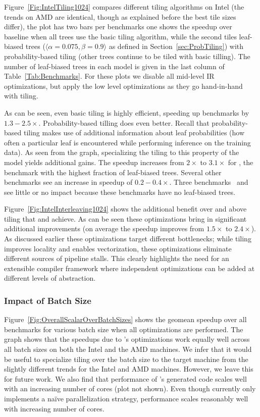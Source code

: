 Figure~\ref{Fig:IntelTiling1024} compares different tiling algorithms on Intel (the trends on AMD are identical,
though as explained before the best tile sizes differ), the plot has two bars per benchmarks one shows the speedup
over baseline when all trees use the basic tiling algorithm, while the second tiles leaf-biased trees
($\langle\alpha =0.075, \beta =0.9 \rangle$ as defined in Section~\ref{sec:ProbTiling})  with probability-based tiling
(other trees continue to be tiled with basic tilling). The number of leaf-biased trees in each model 
is given in the last column of Table~\ref{Tab:Benchmarks}. For these plots we disable all mid-level IR optimizations,
but apply the low level optimizations as they go hand-in-hand with tiling.

As can be seen, even basic tiling is highly efficient, speeding up benchmarks by $1.3 - 2.5\times$.
Probability-based tilling does even better. Recall that probability-based tiling makes use of additional information about leaf probabilities (how
often a particular leaf is encountered while performing inference on the training data). As seen from the graph,
specializing the tiling to this property of the model yields additional gains. The speedup increases from
$2\times$ to $3.1\times$ for , the benchmark with the highest fraction of leaf-biased trees.
Several other benchmarks see an increase in speedup of $0.2- 0.4\times$. Three benchmarks~
and  see little or no impact because these benchmarks have no leaf-biased trees.

Figure~\ref{Fig:IntelInterleaving1024} shows the additional benefit over and above tiling 
that  and  achieve.
As can be seen these optimizations bring in significant additional improvements (on average the speedup improves from $1.5\times$ to $2.4\times$).
As discussed earlier these optimizations target different bottlenecks; while tiling improves locality and enables vectorization, these
optimizations eliminate different sources of pipeline stalls.
This clearly highlights the need for an extensible compiler framework where independent optimizations can be added at different levels of abstraction.

\subsubsection{Impact of Batch Size}
Figure~\ref{Fig:OverallScalarOverBatchSizes} shows the geomean speedup over all benchmarks for various batch size when all \Treebeard{} optimizations
are performed. The graph shows that the speedups due to \Treebeard{}'s 
optimizations work equally well across all batch sizes on both the Intel and the 
AMD machines. We infer that it would be useful to specialize tiling over the 
batch size to the target machine from the slightly different trends for the 
Intel and AMD machines. However, we leave this for future work.  
We also find that performance of \Treebeard{}'s generated 
code scales well with an increasing number of cores (plot not shown). Even though \Treebeard{} 
currently only implements a na\"ive parallelization strategy, performance scales 
reasonably well with increasing number of cores.

